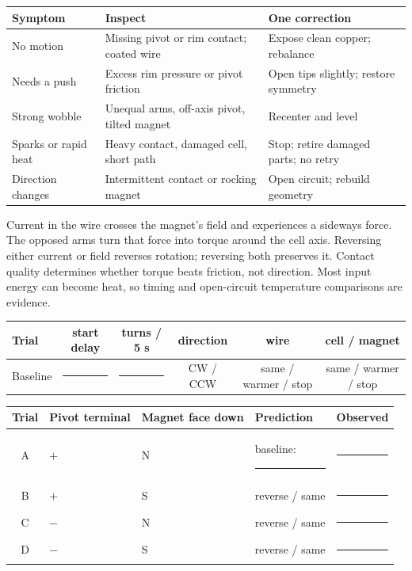 \begin{tabularx}{\linewidth}{@{}>{\RaggedRight\arraybackslash}p{.20\linewidth}>{\RaggedRight\arraybackslash}p{.33\linewidth}L@{}}
\toprule
Symptom & Inspect & One correction\\\midrule
No motion & Missing pivot or rim contact; coated wire & Expose clean copper; rebalance\\
Needs a push & Excess rim pressure or pivot friction & Open tips slightly; restore symmetry\\
Strong wobble & Unequal arms, off-axis pivot, tilted magnet & Recenter and level\\
Sparks or rapid heat & Heavy contact, damaged cell, short path & Stop; retire damaged parts; no retry\\
Direction changes & Intermittent contact or rocking magnet & Open circuit; rebuild geometry\\
\bottomrule
\end{tabularx}

Current in the wire crosses the magnet's field and experiences a sideways
force. The opposed arms turn that force into torque around the cell axis.
Reversing either current or field reverses rotation; reversing both preserves
it. Contact quality determines whether torque beats friction, not direction.
Most input energy can become heat, so timing and open-circuit temperature
comparisons are evidence.

\scriptsize
\begin{center}
\begin{tabular}{@{}lccccc@{}}\toprule
Trial & start delay & turns / 5 s & direction & wire & cell / magnet\\\midrule
Baseline & \rule{1cm}{.3pt} & \rule{1cm}{.3pt} & CW / CCW &
same / warmer / stop & same / warmer / stop\\
\bottomrule
\end{tabular}
\end{center}

\smallskip
\begin{center}
\begin{tabular}{@{}clllc@{}}\toprule
Trial & Pivot terminal & Magnet face down & Prediction & Observed\\\midrule
A & \(+\) & N & baseline: \rule{1cm}{.3pt} & \rule{1cm}{.3pt}\\
B & \(+\) & S & reverse / same & \rule{1cm}{.3pt}\\
C & \(-\) & N & reverse / same & \rule{1cm}{.3pt}\\
D & \(-\) & S & reverse / same & \rule{1cm}{.3pt}\\
\bottomrule
\end{tabular}
\end{center}

